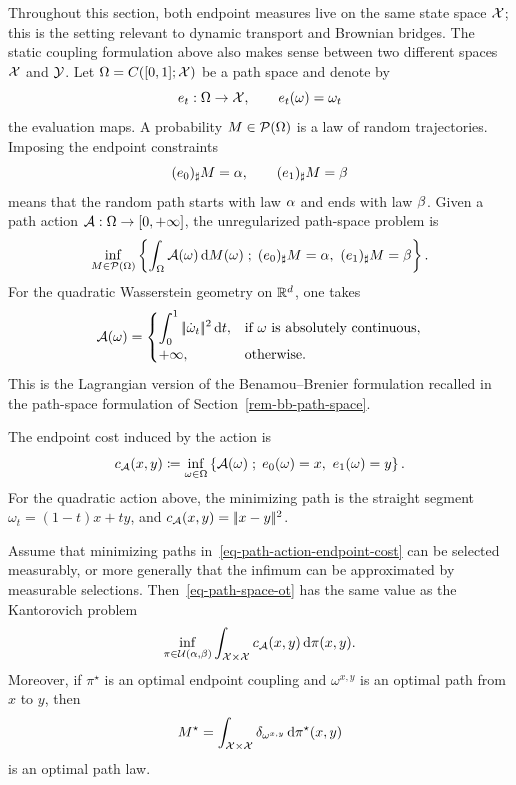 Throughout this section, both endpoint measures live on the same state space $\mathcal{X}$; this is the setting relevant to dynamic transport and Brownian bridges. The static coupling formulation above also makes sense between two different spaces $\mathcal{X}$ and $\mathcal{Y}$.
%
Let $\Omega=C([0,1];\mathcal{X})$ be a path space and denote by
\[
	e_t:\Omega\to\mathcal{X},\qquad e_t(\omega)=\omega_t
\]
the evaluation maps. A probability $M\in\mathcal{P}(\Omega)$ is a law of random trajectories. Imposing the endpoint constraints
\[
	(e_0)_\sharp M=\alpha,
	\qquad
	(e_1)_\sharp M=\beta
\]
means that the random path starts with law $\alpha$ and ends with law $\beta$. Given a path action $\mathcal{A}:\Omega\to[0,+\infty]$, the unregularized path-space problem is
\begin{equation}\label{eq-path-space-ot}
	\inf_{M\in\mathcal{P}(\Omega)}
	\left\{ 
		\int_\Omega \mathcal{A}(\omega)\,\mathrm{d} M(\omega)
	 \;;\; 
		(e_0)_\sharp M=\alpha,\ (e_1)_\sharp M=\beta
	 \right\}.
\end{equation}
For the quadratic Wasserstein geometry on $\mathbb{R}^d$, one takes
\[
	\mathcal{A}(\omega)=
	\begin{cases}
	\displaystyle \int_0^1 |\!| \dot\omega_t |\!|^2\,\mathrm{d} t,
		& \text{if }\omega\text{ is absolutely continuous},\\[.4em]
	+\infty, & \text{otherwise}.
	\end{cases}
\]
This is the Lagrangian version of the Benamou--Brenier formulation recalled in the path-space formulation of Section~\ref{rem-bb-path-space}.

The endpoint cost induced by the action is
\begin{equation}\label{eq-path-action-endpoint-cost}
	c_{\mathcal{A}}(x,y)
	\coloneqq
	\inf_{\omega\in\Omega}
	\left\{ \mathcal{A}(\omega) \;;\; e_0(\omega)=x,\ e_1(\omega)=y \right\}.
\end{equation}
For the quadratic action above, the minimizing path is the straight segment
$\omega_t=(1-t)x+ty$, and $c_{\mathcal{A}}(x,y)=|\!| x-y |\!|^2$.

\begin{prop}\label{prop-path-space-ot-endpoint-reduction}
	Assume that minimizing paths in~\eqref{eq-path-action-endpoint-cost} can be selected measurably, or more generally that the infimum can be approximated by measurable selections. Then~\eqref{eq-path-space-ot} has the same value as the Kantorovich problem
	\[
		\inf_{\pi\in\mathcal{U}(\alpha,\beta)}
		\int_{\mathcal{X}\times\mathcal{X}} c_{\mathcal{A}}(x,y)\,\mathrm{d}\pi(x,y).
	\]
	Moreover, if $\pi^\star$ is an optimal endpoint coupling and $\omega^{x,y}$ is an optimal path from $x$ to $y$, then
	\[
		M^\star
		=
		\int_{\mathcal{X}\times\mathcal{X}}\delta_{\omega^{x,y}}\,\mathrm{d}\pi^\star(x,y)
	\]
	is an optimal path law.
\end{prop}

